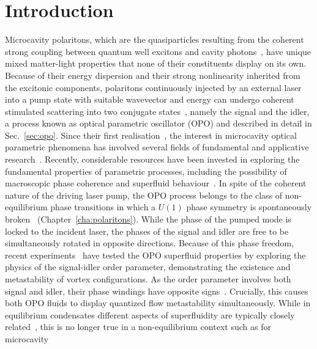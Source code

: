 \chapter{Introduction}

Microcavity polaritons, which are the quasiparticles resulting from
the coherent strong coupling between quantum well excitons and cavity
photons~\cite{9780199228942}, have unique mixed matter-light
properties that none of their constituents display on its own.
Because of their energy dispersion and their strong nonlinearity
inherited from the excitonic components, polaritons continuously
injected by an external laser into a pump state with suitable
wavevector and energy can undergo coherent stimulated scattering into
two conjugate states~\cite{Ciuti_2000,Ciuti_2001,Ciuti_2003}, namely
the signal and the idler, a process known as optical parametric
oscillator (OPO) and described in detail in Sec.~\ref{sec:opo}.
%
Since their first realisation~\cite{Stevenson_2000, Savvidis_2000,
Savvidis_2000_b, Baumberg_2000, Saba_2001}, the interest in
microcavity optical parametric phenomena has involved several fields
of fundamental and applicative research~\cite{Edamatsu_2004,
Savasta_2005, Lanco_2006, Abbarchi_2011, Ardizzone_2012, Xie_2012,
Lecomte_2013}.
%
Recently, considerable resources have been invested in exploring the
fundamental properties of parametric processes, including the
possibility of macroscopic phase coherence and superfluid
behaviour~\cite{Carusotto_2013}.  In spite of the coherent nature of
the driving laser pump, the OPO process belongs to the class of
non-equilibrium phase transitions in which a $U(1)$ phase symmetry is
spontaneously broken~\cite{Wouters_2007}
(Chapter~\ref{cha:polaritons}).  While the phase of the pumped mode is
locked to the incident laser, the phases of the signal and idler are
free to be simultaneously rotated in opposite directions.  Because of
this phase freedom, recent experiments~\cite{Sanvitto_2010} have
tested the OPO superfluid properties by exploring the physics of the
signal-idler order parameter, demonstrating the existence and
metastability of vortex configurations. As the order parameter
involves both signal and idler, their phase windings have opposite
signs~\cite{Sanvitto_2010,Marchetti_2010,9783642241857}. Crucially,
this causes both OPO fluids to display quantized flow metastability
simultaneously.
%
While in equilibrium condensates different aspects of superfluidity
are typically closely related~\cite{Leggett_1999}, this is no longer
true in a non-equilibrium context such as for microcavity
